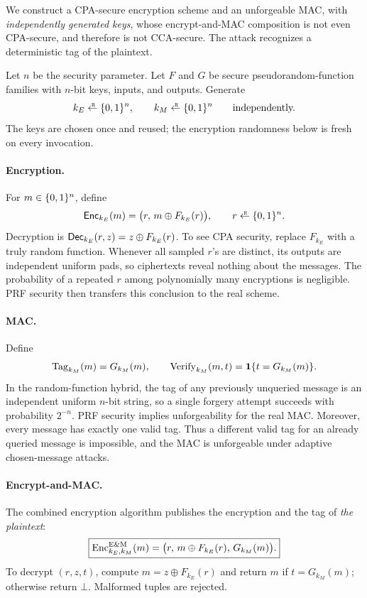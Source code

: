 We construct a CPA-secure encryption scheme and an unforgeable MAC,
with \emph{independently generated keys}, whose encrypt-and-MAC composition
is not even CPA-secure, and therefore is not CCA-secure. The attack recognizes
a deterministic tag of the plaintext.

Let $n$ be the security parameter. Let $F$ and $G$ be secure pseudorandom-function
families with $n$-bit keys, inputs, and outputs. Generate
\[
  k_E\getsr\bits^n,
  \qquad k_M\getsr\bits^n
  \qquad\text{independently.}
\]
The keys are chosen once and reused; the encryption randomness below is fresh
on every invocation.

\paragraph{Encryption.} For $m\in\{0,1\}^n$, define
\begin{equation}
  \Enc_{k_E}(m)=\bigl(r,\,m\oplus F_{k_E}(r)\bigr),
  \qquad r\getsr\bits^n.
  \label{eq:base-encryption}
\end{equation}
Decryption is $\mathsf{Dec}_{k_E}(r,z)=z\oplus F_{k_E}(r)$.
To see CPA security, replace $F_{k_E}$ with a truly random function. Whenever
all sampled $r$'s are distinct, its outputs are independent uniform pads, so
ciphertexts reveal nothing about the messages. The probability of a repeated
$r$ among polynomially many encryptions is negligible. PRF security then
transfers this conclusion to the real scheme.

\paragraph{MAC.} Define
\begin{equation}
  \operatorname{Tag}_{k_M}(m)=G_{k_M}(m),
  \qquad
  \operatorname{Verify}_{k_M}(m,t)=\mathbf{1}\{t=G_{k_M}(m)\}.
  \label{eq:base-mac}
\end{equation}
In the random-function hybrid, the tag of any previously unqueried message
is an independent uniform $n$-bit string, so a single forgery attempt succeeds
with probability $2^{-n}$. PRF security implies unforgeability for the real
MAC. Moreover, every message has exactly one valid tag. Thus a different
valid tag for an already queried message is impossible, and the MAC is
unforgeable under adaptive chosen-message attacks.

\paragraph{Encrypt-and-MAC.} The combined encryption algorithm publishes the encryption and the tag of
\emph{the plaintext}:
\begin{equation}
  \boxed{
  \operatorname{Enc}^{\mathrm{E\&M}}_{k_E,k_M}(m)
    =\bigl(r,\,m\oplus F_{k_E}(r),\,G_{k_M}(m)\bigr).
  }
  \label{eq:composition-2}
\end{equation}
To decrypt $(r,z,t)$, compute $m=z\oplus F_{k_E}(r)$ and return $m$ if
$t=G_{k_M}(m)$; otherwise return $\bot$. Malformed tuples are rejected.

